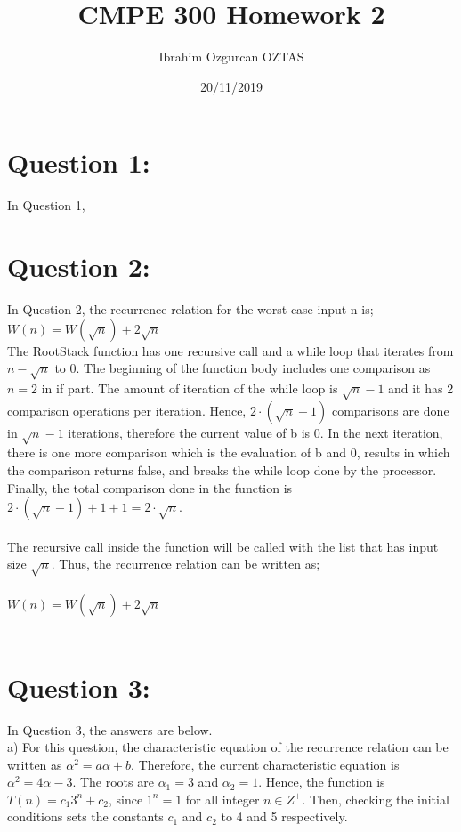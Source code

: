 \documentclass[12pt]{article}
\title{CMPE 300 Homework 2}
\author{Ibrahim Ozgurcan OZTAS}
\date{20/11/2019}
\begin{document}
\maketitle
\newpage

\section{Question 1:}
  In Question 1,

\section{Question 2:}
  In Question 2, the recurrence relation for the worst case input n is; \\
  $ W(n) = W(\sqrt{n}) + 2\sqrt{n} $ \\

  The RootStack function has one recursive call and a while loop that iterates from $n-\sqrt{n}$ to 0. The beginning of the function body includes one comparison as $n=2$ in if part. The amount of iteration of the while loop is $\sqrt{n} - 1$ and it has 2 comparison operations per iteration. Hence, $2 \cdot (\sqrt{n}-1)$ comparisons are done in $\sqrt{n}-1$ iterations, therefore the current value of b is 0. In the next iteration, there is one more comparison which is the evaluation of b and 0, results in which the comparison returns false, and breaks the while loop done by the processor. Finally, the total comparison done in the function is $2\cdot(\sqrt{n}-1)+1+1 = 2\cdot\sqrt{n}$. \\\\
  The recursive call inside the function will be called with the list that has input size $\sqrt{n}$. Thus, the recurrence relation can be written as; \\\\
  $ W(n) = W(\sqrt{n}) + 2\sqrt{n} $ \\\\


\section{Question 3:}
  In Question 3, the answers are below. \\
  a) For this question, the characteristic equation of the recurrence relation can be written as $ \alpha^2=a\alpha+b. $ Therefore, the current characteristic equation is $ \alpha^2=4\alpha-3. $ The roots are $ \alpha_{1}=3 $ and $ \alpha_{2}=1 $. Hence, the function is $T(n)=c_{1}3^n+c_{2}$, since $1^n=1$ for all integer $ n \in Z^+.$ Then, checking the initial conditions sets the constants $c_{1}$ and $c_{2}$ to 4 and 5 respectively.
\end{document}
